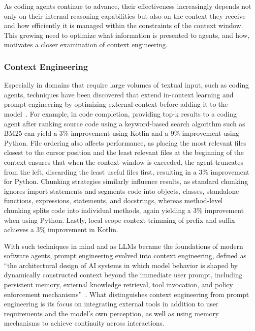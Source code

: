 \documentclass[
english,                 %
bibtex,                  %
includeExtraAbstracts, %
]{kththesis}
\numberwithin{listing}{chapter}
\begin{document}
As coding agents continue to advance, their effectiveness increasingly depends not only on their internal reasoning capabilities but also on the context they receive and how efficiently it is managed within the constraints of the context window. This growing need to optimize what information is presented to agents, and how, motivates a closer examination of context engineering.

\subsubsection{Context Engineering}

Especially in domains that require large volumes of textual input, such as coding agents, techniques have been discovered that extend in-context learning and prompt engineering by optimizing external context before adding it to the model~\cite{yusuf_beyond_2025}. For example, in code completion, providing top-k results to a coding agent after ranking source code using a keyword-based search algorithm such as \gls{BM25} can yield a 3\% improvement using Kotlin and a 9\% improvement using Python. File ordering also affects performance, as placing the most relevant files closest to the cursor position and the least relevant files at the beginning of the context ensures that when the context window is exceeded, the agent truncates from the left, discarding the least useful files first, resulting in a 3\% improvement for Python. Chunking strategies similarly influence results, as standard chunking ignores import statements and segments code into objects, classes, standalone functions, expressions, statements, and docstrings, whereas method-level chunking splits code into individual methods, again yielding a 3\% improvement when using Python. Lastly, local scope context trimming of prefix and suffix achieves a 3\% improvement in Kotlin.

With such techniques in mind and as \glspl{LLM} became the foundations of modern software agents, prompt engineering evolved into context engineering, defined as ``the architectural design of AI systems in which model behavior is shaped by dynamically constructed context beyond the immediate user prompt, including persistent memory, external knowledge retrieval, tool invocation, and policy enforcement mechanisms''~\cite{cinar_prompt_2026}. What distinguishes context engineering from prompt engineering is its focus on integrating external tools in addition to user requirements and the model's own perception, as well as using memory mechanisms to achieve continuity across interactions.
\end{document}
